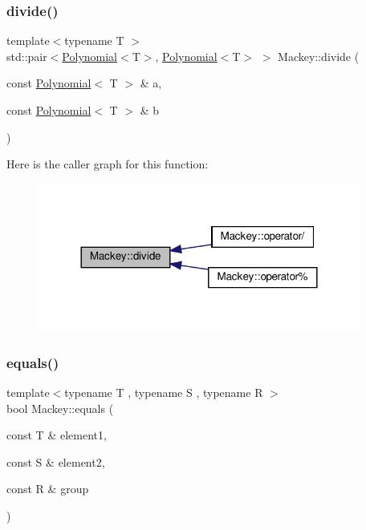 \subsubsection{\texorpdfstring{divide()}{divide()}}
{\footnotesize\ttfamily template$<$typename T $>$ \\
std\+::pair$<$\hyperlink{classMackey_1_1Polynomial}{Polynomial}$<$T$>$, \hyperlink{classMackey_1_1Polynomial}{Polynomial}$<$T$>$ $>$ Mackey\+::divide (\begin{DoxyParamCaption}\item[{const \hyperlink{classMackey_1_1Polynomial}{Polynomial}$<$ T $>$ \&}]{a,  }\item[{const \hyperlink{classMackey_1_1Polynomial}{Polynomial}$<$ T $>$ \&}]{b }\end{DoxyParamCaption})}

Here is the caller graph for this function\+:\nopagebreak
\begin{figure}[H]
\begin{center}
\leavevmode
\includegraphics[width=300pt]{namespaceMackey_a04fadcf186ab504cafeb259178ee4827_icgraph}
\end{center}
\end{figure}
\mbox{\label{namespaceMackey_a82dd9e46100ec78b6238a3b60a5b1b45}} 
\subsubsection{\texorpdfstring{equals()}{equals()}}
{\footnotesize\ttfamily template$<$typename T , typename S , typename R $>$ \\
bool Mackey\+::equals (\begin{DoxyParamCaption}\item[{const T \&}]{element1,  }\item[{const S \&}]{element2,  }\item[{const R \&}]{group }\end{DoxyParamCaption})}



